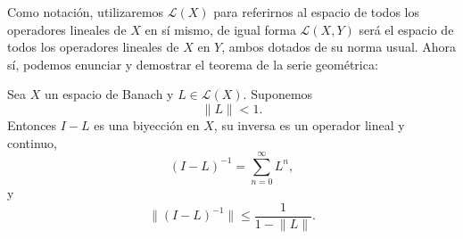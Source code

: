 Como notación, utilizaremos $\mathcal{L}(X)$ para referirnos al espacio de todos los operadores lineales de $X$ en sí mismo, de igual forma $\mathcal{L}(X,Y)$ será el espacio de todos los operadores lineales de $X$ en $Y$, ambos dotados de su norma usual. Ahora sí, podemos enunciar y demostrar el teorema de la serie geométrica:
\begin{teorema}\label{teorema}
	Sea $X$ un espacio de Banach y $L \in \mathcal{L}(X)$. Suponemos
	\begin{equation}
		\lVert L \rVert < 1.
	\end{equation}
	Entonces $I - L$ es una biyección en $X$, su inversa es un operador lineal y continuo,
	\begin{equation}
		(I-L)^{-1} = \sum_{n=0}^{\infty}L^n,
	\end{equation}
	y
	\begin{equation}\label{eq:teo1}
		\lVert (I-L)^{-1} \rVert \leqslant \dfrac{1}{1 - \lVert L \rVert}.
	\end{equation}
\end{teorema}
